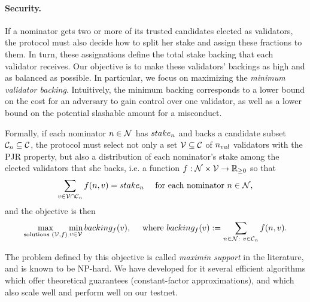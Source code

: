 \paragraph{Security.} If a nominator gets two or more of its trusted candidates elected as validators,
the protocol must also decide how to split her stake and assign these fractions to them.
In turn, these assignations define the total stake backing that each validator receives.
Our objective is to make these validators' backings as high and as balanced as possible.
In particular, we focus on maximizing the \emph{minimum validator backing}.
Intuitively, the minimum backing corresponds to a lower bound on the cost for an adversary to gain control
over one validator, as well as a lower bound on the potential slashable amount for a misconduct.

Formally, if each nominator $n \in \mathcal{N}$ has $stake_{n}$ and backs a candidate subset $\mathcal{C}_{n}\subseteq \mathcal{C}$,
the protocol must select not only a set $\mathcal{V}\subseteq \mathcal{C}$ of $n_{val}$ validators
with the PJR property, but also a distribution of each nominator's stake among the elected validators that she backs,
i.e. a function $f:\mathcal{N}\times\mathcal{V} \rightarrow \mathbb{R}_{\geq 0}$ so that
$$\sum_{v\in \mathcal{V}\cap \mathcal{C}_{n}} f(n, v) = stake_{n} \quad \text{ for each nominator } n\in\mathcal{N},$$
and the objective is then
$$\max_{\text{solutions } (\mathcal{V}, f)} \min_{v\in \mathcal{V}} backing_f(v),
\quad \text{ where } backing_f(v) := \sum_{n\in \mathcal{N}: \ v\in \mathcal{C}_{n}} f(n, v). $$

The problem defined by this objective is called \emph{maximin support} in the literature, and is known to be NP-hard.
We have developed for it several efficient algorithms which offer theoretical guarantees
(constant-factor approximations), and which also scale well and perform well on our testnet.

